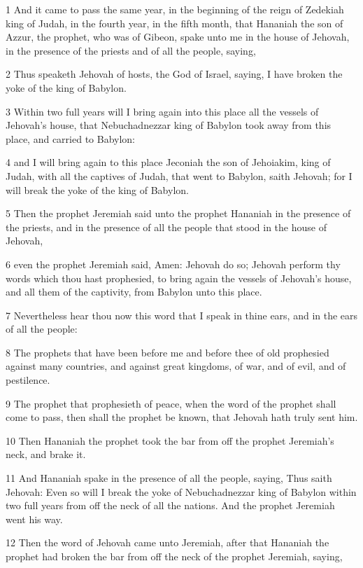 \par 1 And it came to pass the same year, in the beginning of the reign of Zedekiah king of Judah, in the fourth year, in the fifth month, that Hananiah the son of Azzur, the prophet, who was of Gibeon, spake unto me in the house of Jehovah, in the presence of the priests and of all the people, saying,
\par 2 Thus speaketh Jehovah of hosts, the God of Israel, saying, I have broken the yoke of the king of Babylon.
\par 3 Within two full years will I bring again into this place all the vessels of Jehovah's house, that Nebuchadnezzar king of Babylon took away from this place, and carried to Babylon:
\par 4 and I will bring again to this place Jeconiah the son of Jehoiakim, king of Judah, with all the captives of Judah, that went to Babylon, saith Jehovah; for I will break the yoke of the king of Babylon.
\par 5 Then the prophet Jeremiah said unto the prophet Hananiah in the presence of the priests, and in the presence of all the people that stood in the house of Jehovah,
\par 6 even the prophet Jeremiah said, Amen: Jehovah do so; Jehovah perform thy words which thou hast prophesied, to bring again the vessels of Jehovah's house, and all them of the captivity, from Babylon unto this place.
\par 7 Nevertheless hear thou now this word that I speak in thine ears, and in the ears of all the people:
\par 8 The prophets that have been before me and before thee of old prophesied against many countries, and against great kingdoms, of war, and of evil, and of pestilence.
\par 9 The prophet that prophesieth of peace, when the word of the prophet shall come to pass, then shall the prophet be known, that Jehovah hath truly sent him.
\par 10 Then Hananiah the prophet took the bar from off the prophet Jeremiah's neck, and brake it.
\par 11 And Hananiah spake in the presence of all the people, saying, Thus saith Jehovah: Even so will I break the yoke of Nebuchadnezzar king of Babylon within two full years from off the neck of all the nations. And the prophet Jeremiah went his way.
\par 12 Then the word of Jehovah came unto Jeremiah, after that Hananiah the prophet had broken the bar from off the neck of the prophet Jeremiah, saying,
